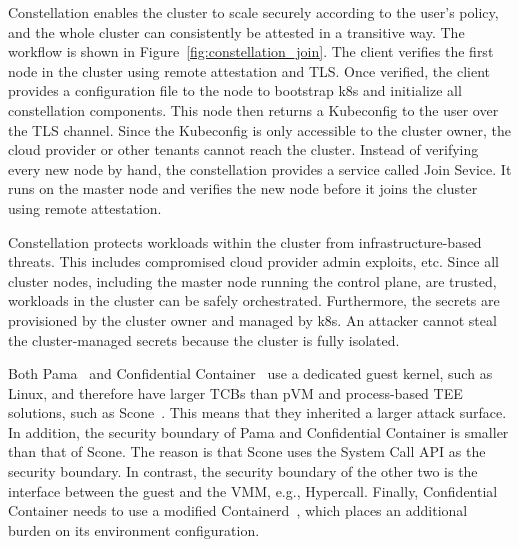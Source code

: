 Constellation enables the cluster to scale securely according to the user's policy, and the whole cluster can consistently be attested in a transitive way. The workflow is shown in Figure~\ref{fig:constellation_join}. The client verifies the first node in the cluster using remote attestation and TLS. Once verified, 
the client provides a configuration file to the node to bootstrap k8s and initialize all constellation components. This node then returns a Kubeconfig to the user over the TLS channel. Since the Kubeconfig is only accessible to the cluster owner, the cloud provider or other tenants cannot reach the 
cluster. Instead of verifying every new node by hand, the constellation provides a service called Join Sevice. It runs on the master node and verifies the new node before it joins the cluster using remote attestation.

Constellation protects workloads within the cluster from infrastructure-based threats. This includes compromised cloud provider admin exploits, etc. Since all cluster nodes, including the master node running the control plane, are trusted, workloads in the cluster can be safely orchestrated. 
Furthermore, the secrets are provisioned by the cluster owner and managed by k8s. An attacker cannot steal the cluster-managed secrets because the cluster is fully isolated.
 
 
Both Pama~\cite*{Johnson2023ParmaCC} and Confidential Container~\cite*{confidential_kata} use a dedicated guest kernel, such as Linux, and therefore have larger TCBs than pVM and process-based TEE solutions, such as Scone~\cite*{10.5555/3026877.3026930}. This means that they inherited a larger attack surface. In addition, the security boundary of Pama and Confidential Container is 
smaller than that of Scone. The reason is that Scone uses the System Call API as the security boundary. In contrast, the security boundary of the other two is the interface between the guest and the VMM, e.g., Hypercall. Finally, Confidential Container needs to use a modified Containerd~\cite*{containerd}, which 
places an additional burden on its environment configuration. 



\cleardoublepage

